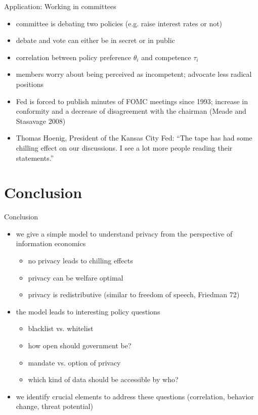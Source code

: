 \documentclass[bigger]{beamer}
\newcommand{\backupbegin}{\newcounter{framenumberappendix}   \setcounter{framenumberappendix}{\value{framenumber}}}
\begin{document}
\begin{frame}[label={sec:org1623462}]{Application: Working in committees}
\begin{itemize}
\item committee is debating two policies (e.g. raise interest rates or not)
\item debate and vote can either be in secret or in public
\item correlation between policy preference \(\theta_{i}\) and competence \(\tau_{i}\)
\item members worry about being perceived as incompetent; advocate less radical positions
\item Fed is forced to publish minutes of FOMC meetings since 1993; \linebreak increase in conformity and a decrease of disagreement with the chairman (Meade and Stasavage 2008)
\item Thomas Hoenig, President of the Kansas City Fed: ``The tape has had some chilling effect on our discussions. I see a lot more people reading their statements.''
\end{itemize}
\end{frame}


\section{Conclusion}
\label{sec:org96eb9c8}
\begin{frame}[label={sec:orgac86ba8}]{Conclusion}
\begin{itemize}
\item we give a simple model to understand privacy from the perspective of information economics
\begin{itemize}
\item no privacy leads to chilling effects
\item privacy can be welfare optimal
\item privacy is redistributive (similar to freedom of speech, Friedman 72)
\end{itemize}
\item the model leads to interesting policy questions
\begin{itemize}
\item blacklist vs. whitelist
\item how open should government be?
\item mandate vs. option of privacy
\item which kind of data should be accessible by who?
\end{itemize}
\item we identify crucial elements to address these questions (correlation, behavior change, threat potential)
\end{itemize}


\backupbegin
\end{frame}
\end{document}
